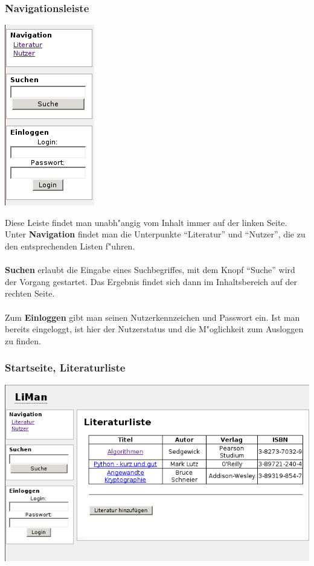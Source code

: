 \subsubsection{Navigationsleiste}
\begin{floatingfigure}[r]{0.4\textwidth}
\centering
\includegraphics[scale=0.6]{navigation.png} 
\end{floatingfigure}

Diese Leiste findet man unabh"angig vom Inhalt immer auf der linken Seite.
Unter {\bf Navigation} findet man die Unterpunkte ``Literatur'' und ``Nutzer'', die zu den entsprechenden Listen f"uhren.\\
\\
{\bf Suchen} erlaubt die Eingabe eines Suchbegriffes, mit dem Knopf ``Suche'' wird der Vorgang gestartet. 
Das Ergebnis findet sich dann im Inhaltsbereich auf der rechten Seite.\\
\\
Zum {\bf Einloggen} gibt man seinen Nutzerkennzeichen und Passwort ein. Ist man bereits eingeloggt, ist hier der Nutzerstatus
und die M"oglichkeit zum Ausloggen zu finden.
\subsubsection{Startseite, Literaturliste}
\includegraphics[scale=0.6]{index.png}

